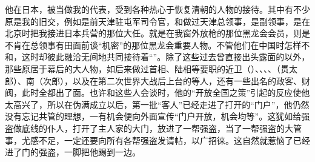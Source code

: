 他在日本，被当做我的代表，受到各种热心于恢复清朝的人物的接待。其中有不少原是我的旧交，例如是前天津驻屯军司令官，和做过天津总领事，是副领事，是在北京时把我接进日本兵营的那位大任。就是在我窗外放枪的那位黑龙会会员，则是不肯在总领事有田面前谈“机密”的那位黑龙会重要人物。不管他们在中国时怎样不和，这时却彼此融洽无间地共同接待着“”。除了这些过去曾直接出头露面的以外，那些原居于幕后的大人物，如后来做过首相、陆相等要职的近卫（）、、、、（贯太郎）、南（次郎），以及在第二次世界大战后上台的等人，还有一些出名的政客、财阀，此时全都出了面。也许和这些人会谈时，他的“开放全国之策”引起的反应使他太高兴了，所以在伪满成立以后，第一批“客人”已经走进了打开的“门户”，他仍然没有忘记共管的理想，一有机会便向外面宣传“门户开放，机会均等”。这犹如给强盗做底线的仆人，打开了主人家的大门，放进了一帮强盗，当了一帮强盗的大管事，尤感不足，一定还要向所有各帮强盗发请帖，以广招徕。这自然就惹恼了已经进了门的强盗，一脚把他踢到一边。
